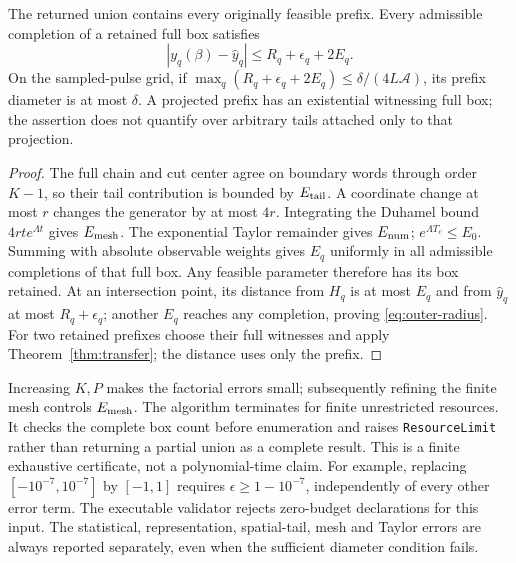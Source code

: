 \begin{theorem}
\label{thm:outer}
The returned union contains every originally feasible prefix. Every admissible
completion of a retained full box satisfies
\begin{equation}
 |y_q(\beta)-\widehat y_q|\le R_q+\epsilon_q+2E_q.
 \label{eq:outer-radius}
\end{equation}
On the sampled-pulse grid, if
$\max_q(R_q+\epsilon_q+2E_q)\le\delta/(4L\mathcal A)$, its prefix diameter
is at most $\delta$. A projected prefix has an existential witnessing full
box; the assertion does not quantify over arbitrary tails attached only to
that projection.
\end{theorem}
\begin{proof}
The full chain and cut center agree on boundary words through order $K-1$,
so their tail contribution is bounded by $E_{\rm tail}$. A coordinate change
at most $r$ changes the generator by at most $4r$. Integrating the Duhamel
bound $4rt e^{\Lambda t}$ gives $E_{\rm mesh}$. The exponential Taylor
remainder gives $E_{\rm num}$; $e^{\Lambda T_c}\le E_0$.
Summing with absolute observable weights gives $E_q$ uniformly in all
admissible completions of that full box. Any feasible parameter therefore
has its box retained. At an intersection point, its distance from $H_q$ is
at most $E_q$ and from $\widehat y_q$ at most $R_q+\epsilon_q$; another
$E_q$ reaches any completion, proving \eqref{eq:outer-radius}.
For two retained prefixes choose their full witnesses and apply
Theorem~\ref{thm:transfer}; the distance uses only the prefix.
\end{proof}

Increasing $K,P$ makes the factorial errors small; subsequently refining the
finite mesh controls $E_{\rm mesh}$. The algorithm terminates for finite
unrestricted resources. It checks the complete box count before enumeration
and raises \texttt{ResourceLimit} rather than returning a partial union as a
complete result. This is a finite exhaustive certificate, not a polynomial-time
claim. For example, replacing $[-10^{-7},10^{-7}]$ by $[-1,1]$ requires
$\epsilon\ge1-10^{-7}$, independently of every other error term. The executable
validator rejects zero-budget declarations for this input. The statistical,
representation, spatial-tail, mesh and Taylor errors are always reported
separately, even when the sufficient diameter condition fails.
